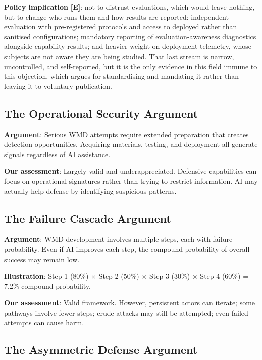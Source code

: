 \documentclass[11pt,letterpaper]{article}
\begin{document}
\textbf{Policy implication} \textbf{[E]}: not to distrust evaluations, which would leave nothing, but to change who runs them and how results are reported: independent evaluation with pre-registered protocols and access to deployed rather than sanitised configurations; mandatory reporting of evaluation-awareness diagnostics alongside capability results; and heavier weight on deployment telemetry, whose subjects are not aware they are being studied. That last stream is narrow, uncontrolled, and self-reported, but it is the only evidence in this field immune to this objection, which argues for standardising and mandating it rather than leaving it to voluntary publication.

\subsection{The Operational Security Argument}

\textbf{Argument}: Serious WMD attempts require extended preparation that creates detection opportunities. Acquiring materials, testing, and deployment all generate signals regardless of AI assistance.

\textbf{Our assessment}: Largely valid and underappreciated. Defensive capabilities can focus on operational signatures rather than trying to restrict information. AI may actually help defense by identifying suspicious patterns.

\subsection{The Failure Cascade Argument}

\textbf{Argument}: WMD development involves multiple steps, each with failure probability. Even if AI improves each step, the compound probability of overall success may remain low.

\textbf{Illustration}: Step 1 (80\%) $\times$ Step 2 (50\%) $\times$ Step 3 (30\%) $\times$ Step 4 (60\%) = 7.2\% compound probability.

\textbf{Our assessment}: Valid framework. However, persistent actors can iterate; some pathways involve fewer steps; crude attacks may still be attempted; even failed attempts can cause harm.

\subsection{The Asymmetric Defense Argument}
\end{document}
